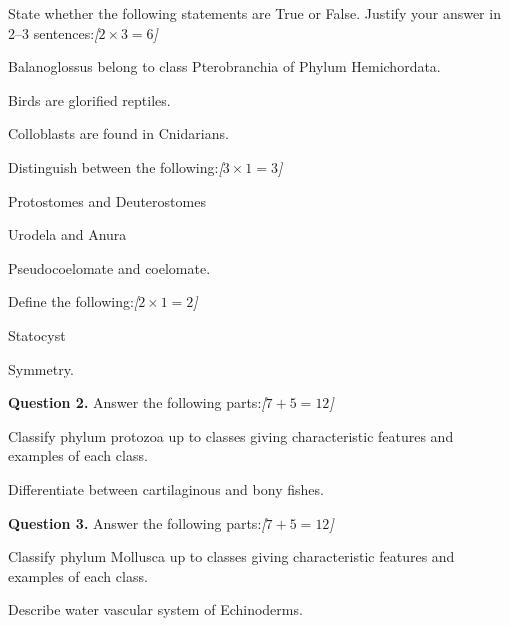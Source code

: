 \documentclass[11pt,a4paper]{article}
\newcommand{\pts}[1]{\hfill   \textit{[#1]}}
\begin{document}
\begin{parts}
  \item State whether the following statements are True or False. Justify your answer in 2--3 sentences:\pts{$2  \times 3 = 6$}
  
\begin{parts}
    \item Balanoglossus belong to class Pterobranchia of Phylum Hemichordata.
    \item Birds are glorified reptiles.
    \item Colloblasts are found in Cnidarians.
  \end{parts}

  \item Distinguish between the following:\pts{$3  \times 1 = 3$}
  
\begin{parts}
    \item Protostomes and Deuterostomes
    \item Urodela and Anura
    \item Pseudocoelomate and coelomate.
  \end{parts}

  \item Define the following:\pts{$2  \times 1 = 2$}
  
\begin{parts}
    \item Statocyst
    \item Symmetry.
  \end{parts}
\end{parts}

\medskip


\noindent   \textbf{Question 2.} Answer the following parts:\pts{$7 + 5 = 12$}

\begin{parts}
  \item Classify phylum protozoa up to classes giving characteristic features and examples of each class.
  \item Differentiate between cartilaginous and bony fishes.
\end{parts}

\medskip


\noindent   \textbf{Question 3.} Answer the following parts:\pts{$7 + 5 = 12$}

\begin{parts}
  \item Classify phylum Mollusca up to classes giving characteristic features and examples of each class.
  \item Describe water vascular system of Echinoderms.
\end{parts}
\end{document}
